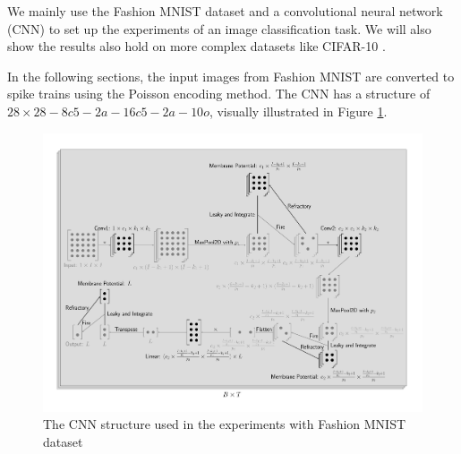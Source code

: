     We mainly use the Fashion MNIST dataset \cite{xiao2017/online} and a convolutional neural network (CNN) \cite{726791} to set up the experiments of an image classification task. We will also show the results also hold on more complex datasets like CIFAR-10 \cite{Krizhevsky2009}. 

    In the following sections, the input images from Fashion MNIST are converted to spike trains using the Poisson encoding method. The CNN has a structure of $28\times 28 - 8c5 - 2a - 16c5 - 2a - 10o$, visually illustrated in Figure \ref{fig:scnn_structure}. 

    \begin{figure}[!htpb]
        \centering
        \includegraphics[width=\textwidth]{assets/standard/FashionMNIST/snn2.pdf}
        \caption{The CNN structure used in the experiments with Fashion MNIST dataset}
        \label{fig:scnn_structure}
    \end{figure}

